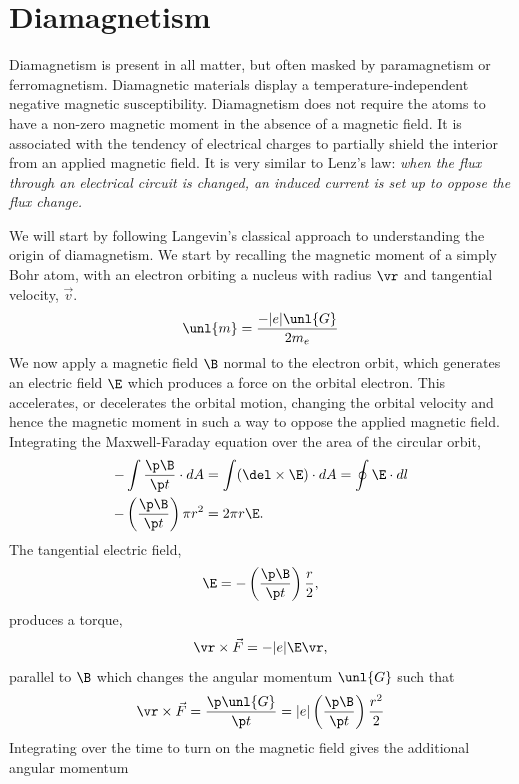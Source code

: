 \documentclass[a4paper, 11pt, normalem]{report}
\begin{document}
\chapter{Diamagnetism}
Diamagnetism is present in all matter, but often masked by paramagnetism or ferromagnetism. 
Diamagnetic materials display a temperature-independent negative magnetic susceptibility. 
Diamagnetism does not require the atoms to have a non-zero magnetic moment in the absence of a magnetic field. 
It is associated with the tendency of electrical charges to partially shield the interior from an applied magnetic field. 
It is very similar to Lenz's law: \emph{when the flux through an electrical circuit is changed, an induced current is set up to oppose the flux change.}

We will start by following Langevin's classical approach to understanding the origin of diamagnetism.
We start by recalling the magnetic moment of a simply Bohr atom, with an electron orbiting a nucleus with radius $\vr$ and tangential velocity, $\vec{v}$.
\begin{equation}
    \unl{m} = \frac{-|e|\unl{G}}{2m_e}
\end{equation}
We now apply a magnetic field $\B$ normal to the electron orbit, which generates an electric field $\E$ which produces a force on the orbital electron. 
This accelerates, or decelerates the orbital motion, changing the orbital velocity and hence the magnetic moment in such a way to oppose the applied magnetic field. 
Integrating the Maxwell-Faraday equation over the area of the circular orbit, 
\begin{align}
    -\int \frac{\p\B}{\p t}\cdot dA &= \int (\del\times\E)\cdot dA = \oint \E\cdot dl \\
    -\left(\frac{\p\B}{\p t}\right)\pi r^2 &= 2\pi r\E.
\end{align}
The tangential electric field, 
\begin{equation}
    \E = -\left(\frac{\p\B}{\p t}\right)\frac{r}{2},
\end{equation}
produces a torque,
\begin{equation}
    \vr\times\vec{F} = -|e|\E\vr,
\end{equation}
parallel to $\B$ which changes the angular momentum $\unl{G}$ such that
\begin{equation}
    \vr\times\vec{F} = \frac{\p\unl{G}}{\p t} = |e|\left(\frac{\p\B}{\p t}\right)\frac{r^2}{2}
\end{equation}
Integrating over the time to turn on the magnetic field gives the additional angular momentum
\end{document}
